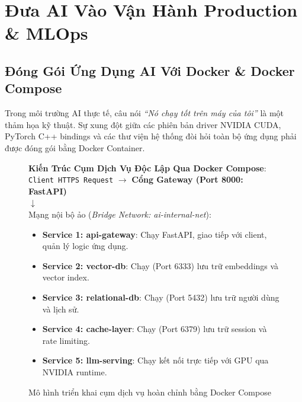
\chapter{Đưa AI Vào Vận Hành Production \& MLOps}
\label{ch:phase5-production}

\section{Đóng Gói Ứng Dụng AI Với Docker \& Docker Compose}
\label{sec:prod-docker}

Trong môi trường AI thực tế, câu nói \textit{``Nó chạy tốt trên máy của tôi''} là một thảm họa kỹ thuật. Sự xung đột giữa các phiên bản driver NVIDIA CUDA, PyTorch C++ bindings và các thư viện hệ thống đòi hỏi toàn bộ ứng dụng phải được đóng gói bằng Docker Container.

\begin{figure}[htbp]
\centering
\begin{tcolorbox}[colback=boxbg,colframe=primarycolor,width=0.95\textwidth,arc=2pt]
\small
\textbf{Kiến Trúc Cụm Dịch Vụ Độc Lập Qua Docker Compose}:\\[0.2cm]
\texttt{Client HTTPS Request} $\longrightarrow$ \textbf{Cổng Gateway (Port 8000: FastAPI)}\\
$\downarrow$\\
Mạng nội bộ ảo (\textit{Bridge Network: ai-internal-net}):
\begin{itemize}
  \item \textbf{Service 1: api-gateway}: Chạy FastAPI, giao tiếp với client, quản lý logic ứng dụng.
  \item \textbf{Service 2: vector-db}: Chạy  (Port 6333) lưu trữ embeddings và vector index.
  \item \textbf{Service 3: relational-db}: Chạy  (Port 5432) lưu trữ người dùng và lịch sử.
  \item \textbf{Service 4: cache-layer}: Chạy  (Port 6379) lưu trữ session và rate limiting.
  \item \textbf{Service 5: llm-serving}: Chạy  kết nối trực tiếp với GPU qua NVIDIA runtime.
\end{itemize}
\end{tcolorbox}
\caption{Mô hình triển khai cụm dịch vụ hoàn chỉnh bằng Docker Compose}
\label{fig:docker-compose-arch}
\end{figure}

